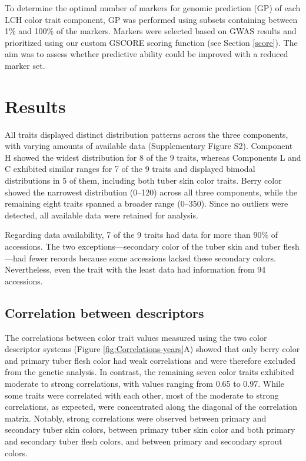 \documentclass[pdflatex,sn-mathphys-ay]{sn-jnl}%
\begin{document}
To determine the optimal number of markers for genomic prediction (GP) of each LCH color trait component, GP was performed using subsets containing between 1\% and 100\% of the markers. Markers were selected based on GWAS results and prioritized using our custom GSCORE scoring function (see Section \ref{score}). The aim was to assess whether predictive ability could be improved with a reduced marker set.








\section{Results}



All traits displayed distinct distribution patterns across the three components, with varying amounts of available data (Supplementary Figure S2). Component H showed the widest distribution for 8 of the 9 traits, whereas Components L and C exhibited similar ranges for 7 of the 9 traits and displayed bimodal distributions in 5 of them, including both tuber skin color traits. Berry color showed the narrowest distribution (0–120) across all three components, while the remaining eight traits spanned a broader range (0–350). Since no outliers were detected, all available data were retained for analysis.

Regarding data availability, 7 of the 9 traits had data for more than 90\% of accessions. The two exceptions—secondary color of the tuber skin and tuber flesh—had fewer records because some accessions lacked these secondary colors. Nevertheless, even the trait with the least data had information from 94 accessions.


\subsection{Correlation between descriptors}

The correlations between color trait values measured using the two color descriptor systems (Figure \ref{fig:Correlations-years}A) showed that only berry color and primary tuber flesh color had weak correlations and were therefore excluded from the genetic analysis. In contrast, the remaining seven color traits exhibited moderate to strong correlations, with values ranging from 0.65 to 0.97. While some traits were correlated with each other, most of the moderate to strong correlations, as expected, were concentrated along the diagonal of the correlation matrix. Notably, strong correlations were observed between primary and secondary tuber skin colors, between primary tuber skin color and both primary and secondary tuber flesh colors, and between primary and secondary sprout colors.
\end{document}
